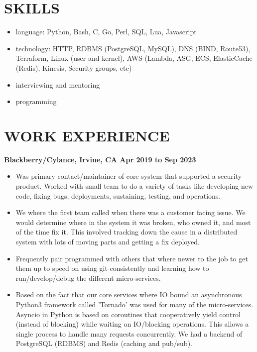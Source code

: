 \documentclass{res}
\begin{document}
\address{john@jjdev.com - (714) 895 6311 - Westminster, CA 92683}

\begin{resume}
  \section{SKILLS}
  \begin{itemize}
  \item
    language: Python, Bash, C, Go, Perl, SQL, Lua, Javascript
  \item
      technology: HTTP, RDBMS (PostgreSQL, MySQL), DNS (BIND, Route53), Terraform, Linux (user and kernel), AWS (Lambda, ASG, ECS, ElasticCache (Redis), Kinesis, Security groups, etc)
  \item
      interviewing and mentoring
  \item
      programming
  \end{itemize}

  \section{WORK EXPERIENCE}
  {\large \bf Blackberry/Cylance, Irvine, CA \hfill Apr 2019 to Sep 2023}
  \begin{itemize}
  \item
    Was primary contact/maintainer of core system that supported a
    security product.  Worked with small team to do a variety of tasks
    like developing new code, fixing bugs, deployments, sustaining,
    testing, and operations.
  \item
    We where the first team called when there was a customer facing
    issue. We would determine where in the system it was broken, who
    owned it, and most of the time fix it.  This involved tracking down
    the cause in a distributed system with lots of moving parts and
    getting a fix deployed.
  \item
    Frequently pair programmed with others that where newer to the job
    to get them up to speed on using git consistently and learning how
    to run/develop/debug the different micro-services.
  \item
Based on the fact that our core services where IO bound
an asynchronous Python3 framework called 'Tornado' was used for many
of the micro-services. Asyncio in Python is based on coroutines that
cooperatively yield control (instead of blocking) while waiting on
IO/blocking operations. This allows a single process to handle many
requests concurrently.  We had a backend of PostgreSQL (RDBMS) and Redis
(caching and pub/sub).


\end{itemize}
\end{resume}
\end{document}
